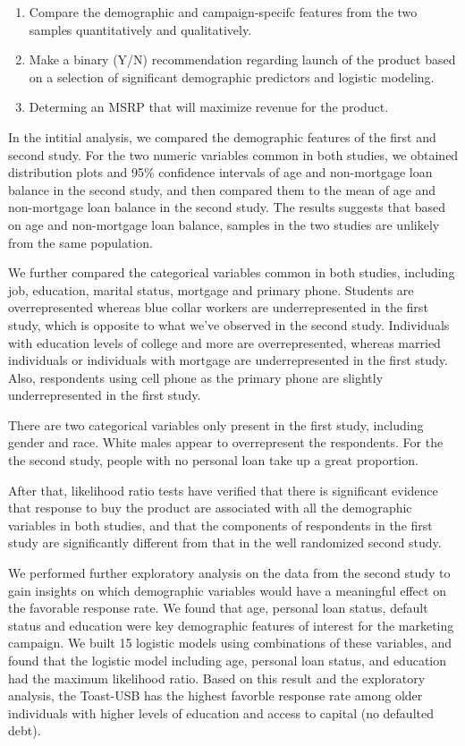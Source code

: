 \documentclass[]{article}
\begin{document}
\begin{enumerate}
\def\labelenumi{\arabic{enumi}.}
\item
  Compare the demographic and campaign-specifc features from the two
  samples quantitatively and qualitatively.
\item
  Make a binary (Y/N) recommendation regarding launch of the product
  based on a selection of significant demographic predictors and
  logistic modeling.
\item
  Determing an MSRP that will maximize revenue for the product.
\end{enumerate}

In the intitial analysis, we compared the demographic features of the
first and second study. For the two numeric variables common in both
studies, we obtained distribution plots and 95\% confidence intervals of
age and non-mortgage loan balance in the second study, and then compared
them to the mean of age and non-mortgage loan balance in the second
study. The results suggests that based on age and non-mortgage loan
balance, samples in the two studies are unlikely from the same
population.

We further compared the categorical variables common in both studies,
including job, education, marital status, mortgage and primary phone.
Students are overrepresented whereas blue collar workers are
underrepresented in the first study, which is opposite to what we've
observed in the second study. Individuals with education levels of
college and more are overrepresented, whereas married individuals or
individuals with mortgage are underrepresented in the first study. Also,
respondents using cell phone as the primary phone are slightly
underrepresented in the first study.

There are two categorical variables only present in the first study,
including gender and race. White males appear to overrepresent the
respondents. For the the second study, people with no personal loan take
up a great proportion.

After that, likelihood ratio tests have verified that there is
significant evidence that response to buy the product are associated
with all the demographic variables in both studies, and that the
components of respondents in the first study are significantly different
from that in the well randomized second study.

We performed further exploratory analysis on the data from the second
study to gain insights on which demographic variables would have a
meaningful effect on the favorable response rate. We found that age,
personal loan status, default status and education were key demographic
features of interest for the marketing campaign. We built 15 logistic
models using combinations of these variables, and found that the
logistic model including age, personal loan status, and education had
the maximum likelihood ratio. Based on this result and the exploratory
analysis, the Toast-USB has the highest favorble response rate among
older individuals with higher levels of education and access to capital
(no defaulted debt).
\end{document}
